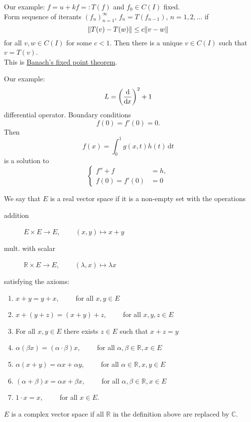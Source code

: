 Our example: $f=u+kf =: T(f)$ and $f_0 \in C(I)$ fixed. \\
Form sequence of iterants $(f_n)_{n=1}^{\infty}$, $f_n = T(f_{n-1})$, $n=1,2,\dots$ if
\[
	\norm{T(v)-T(w)} \leq c \norm{v-w}
\]
for all $v,w \in C(I)$ for some $c<1$. Then there is a unique $v \in C(I)$ such that $v = T(v)$. \\
This is \underline{Banach's fixed point theorem}.
\begin{definition*}
	Our example: 
	\[
		L = \left( \frac{\mathrm{d}\mkern-1.0mu }{\mathrm{d}\mkern-1.0mu x}  \right)^2 + 1 
	\]
	differential operator. Boundary conditions 
	\[
		f(0) = f'(0) = 0.
	\]
	Then 
	\[
		f(x) = \int_{0}^{1} g(x,t)h(t) \,\mathrm{d}t 
	\]
	is a solution to
	\[
		\begin{cases}
			f''+f &= h, \\
			f(0) = f'(0)& = 0	
		\end{cases}
	\]
\end{definition*}
\begin{definition*}
	We say that $E$ is a real vector space  if it is a non-empty set with the operations 
	\begin{description}
		\item[addition] $E \times E \to E$, $\qquad (x,y) \mapsto x+y$
		\item[mult. with scalar] $\mathbb{R} \times E \to E$, $ \qquad (\lambda,x) \mapsto \lambda x$ 
	\end{description}
	satisfying the axioms:
	\begin{enumerate}[(1)]
		\item $x+y = y+x, \qquad$ for all $x,y \in E$
		\item $x+(y+z)= (x+y)+z, \qquad $ for all $x,y,z \in E$
		\item For all $x,y \in E$ there exists $z \in E$ such that $x+z = y$
		\item $\alpha (\beta x) = (\alpha \cdot \beta)x, \qquad $ for all $\alpha,\beta \in \mathbb{R}, x \in E$
		\item $\alpha(x+y) = \alpha x+ \alpha y, \qquad $ for all $\alpha \in \mathbb{R}, x,y \in E$
		\item $(\alpha + \beta) x = \alpha x + \beta x, \qquad $ for all $\alpha, \beta \in \mathbb{R}, x \in E$
		\item $1 \cdot x = x, \qquad $ for all $x \in E$.  
	\end{enumerate}
\end{definition*}
\begin{bemerkung}
	$E$ is a complex vector space if all $\mathbb{R}$ in the definition above are replaced by $\mathbb{C}$.
\end{bemerkung}
